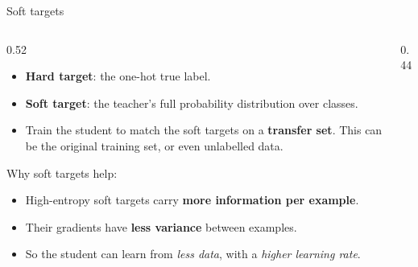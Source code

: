 \documentclass[aspectratio=169,11pt]{beamer}
\begin{document}
\begin{frame}{Soft targets}
  \begin{columns}[T]
    \begin{column}{0.52\textwidth}
      \small
      \begin{itemize}
        \item \textbf{Hard target}: the one-hot true label.
        \item \textbf{Soft target}: the teacher's full probability distribution over classes.
        \item Train the student to match the soft targets on a \textbf{transfer set}. This can be the original training set, or even unlabelled data.
      \end{itemize}
      \vspace{1mm}
      Why soft targets help:
      \begin{itemize}
        \item High-entropy soft targets carry \textbf{more information per example}.
        \item Their gradients have \textbf{less variance} between examples.
        \item So the student can learn from \emph{less data}, with a \emph{higher learning rate}.
      \end{itemize}
    \end{column}
    \begin{column}{0.44\textwidth}
      \centering
    \end{column}
  \end{columns}
\end{frame}
\end{document}
